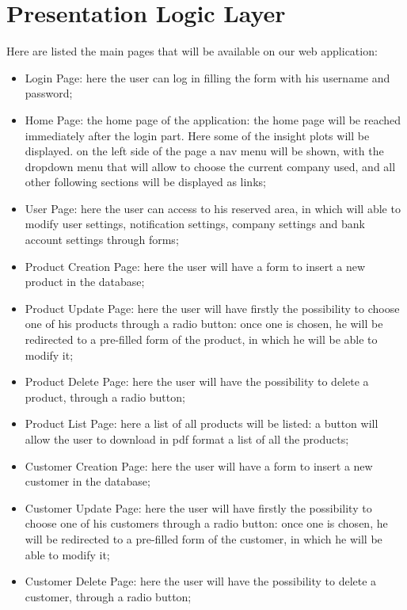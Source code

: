 \section{Presentation Logic Layer}


Here are listed the main pages that will be available on our web application:

\begin{itemize}
    \item Login Page: here the user can log in filling the form with his username and password;
    \item Home Page: the home page of the application: the home page will be reached immediately after the login part. Here some of the insight plots will be displayed. on the left side of the page a nav menu will be shown, with the dropdown menu that will allow to choose the current company used, and all other following sections will be displayed as links;
    \item User Page: here the user can access to his reserved area, in which will able to modify user settings, notification settings, company settings and bank account settings through forms;
    \item Product Creation Page: here the user will have a form to insert a new product in the database;
    \item Product Update Page: here the user will have firstly the possibility to choose one of his products through a radio button: once one is chosen, he will be redirected to a pre-filled form of the product, in which he will be able to modify it;
    \item Product Delete Page: here the user will have the possibility to delete a product, through a radio button;
    \item Product List Page: here a list of all products will be listed: a button will allow the user to download in pdf format a list of all the products;
    \item Customer Creation Page: here the user will have a form to insert a new customer in the database;
    \item Customer Update Page: here the user will have firstly the possibility to choose one of his customers through a radio button: once one is chosen, he will be redirected to a pre-filled form of the customer, in which he will be able to modify it;
    \item Customer Delete Page: here the user will have the possibility to delete a customer, through a radio button;

\end{itemize}
